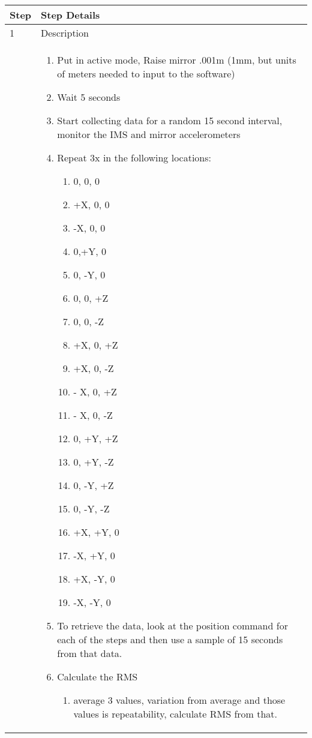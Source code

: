 \documentclass[SE,lsstdraft,STR,toc]{lsstdoc}
\providecommand{\tightlist}{
  \setlength{\itemsep}{0pt}\setlength{\parskip}{0pt}}
\begin{document}
\begin{longtable}{p{1cm}p{15cm}}
\hline
{Step} & Step Details\\ \hline
1 & Description \\
 & \begin{minipage}[t]{15cm}
{\footnotesize
\begin{enumerate}
\tightlist
\item
  Put in active mode, Raise mirror .001m (1mm, but units of meters
  needed to input to the software)
\item
  Wait 5 seconds
\item
  Start collecting data for a random 15 second interval, monitor the IMS
  and mirror accelerometers
\item
  Repeat 3x in the following locations:

  \begin{enumerate}
  \tightlist
  \item
    0, 0, 0
  \item
    +X, 0, 0
  \item
    -X, 0, 0
  \item
    0,+Y, 0
  \item
    0, -Y, 0
  \item
    0, 0, +Z
  \item
    0, 0, -Z
  \item
    +X, 0, +Z
  \item
    +X, 0, -Z
  \item
    - X, 0, +Z
  \item
    - X, 0, -Z
  \item
    0, +Y, +Z
  \item
    0, +Y, -Z
  \item
    0, -Y, +Z
  \item
    0, -Y, -Z~
  \item
    +X, +Y, 0
  \item
    -X, +Y, 0
  \item
    +X, -Y, 0
  \item
    -X, -Y, 0
  \end{enumerate}
\item
  To retrieve the data, look at the position command for each of the
  steps and then use a sample of 15 seconds from that data.
\item
  Calculate the RMS

  \begin{enumerate}
  \tightlist
  \item
    average 3 values, variation from average and those values is
    repeatability, calculate RMS from that.
  \end{enumerate}
\end{enumerate}

}
\end{minipage}
\end{longtable}
\end{document}
